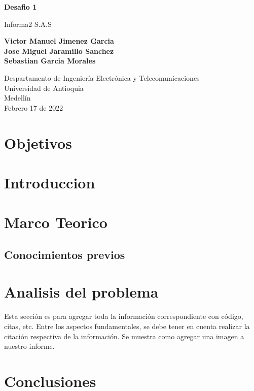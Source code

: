 \documentclass{article}
\begin{document}
\begin{titlepage}
    \begin{center}
        \vspace*{1cm}
            
        \Huge
        \textbf{Desafio 1}
            
        \vspace{0.5cm}
        \LARGE
        Informa2 S.A.S
            
        \vspace{1.5cm}
            
        \textbf{Victor Manuel Jimenez Garcia\\
                Jose Miguel Jaramillo Sanchez\\
                Sebastian Garcia Morales}

        \vfill
            
        \vspace{0.8cm}
            
        \Large
        Despartamento de Ingeniería Electrónica y Telecomunicaciones\\
        Universidad de Antioquia\\
        Medellín\\
        Febrero 17 de 2022
            
    \end{center}
\end{titlepage}

\tableofcontents

\newpage
\section{Objetivos}\label{objetivos}
\section{Introduccion}\label{intro}
\section{Marco Teorico}\label{marco}

\subsection{Conocimientos previos}


\section{Analisis del problema} \label{analisis}
Esta sección es para agregar toda la información correspondiente con código, citas, etc.\newline
Entre los aspectos fundamentales, se debe tener en cuenta realizar la citación respectiva de la información.\newline
Se muestra como agregar una imagen a nuestro informe.


\section{Conclusiones} \label{conclusiones}




\end{document}
